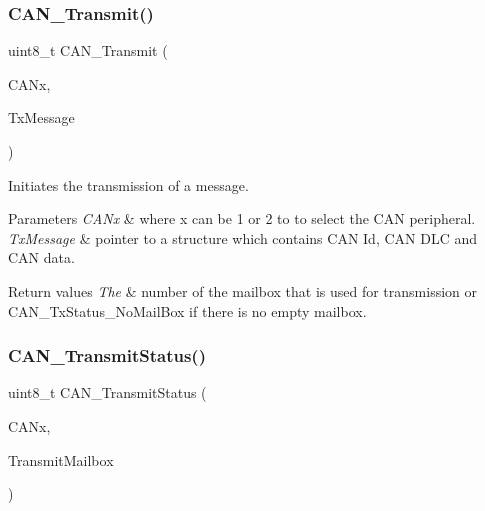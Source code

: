 \subsubsection{\texorpdfstring{CAN\_Transmit()}{CAN\_Transmit()}}
{\footnotesize\ttfamily uint8\+\_\+t C\+A\+N\+\_\+\+Transmit (\begin{DoxyParamCaption}\item[{\mbox{\hyperlink{struct_c_a_n___type_def}{C\+A\+N\+\_\+\+Type\+Def}} $\ast$}]{C\+A\+Nx,  }\item[{\mbox{\hyperlink{struct_can_tx_msg}{Can\+Tx\+Msg}} $\ast$}]{Tx\+Message }\end{DoxyParamCaption})}



Initiates the transmission of a message. 


\begin{DoxyParams}{Parameters}
{\em C\+A\+Nx} & where x can be 1 or 2 to to select the C\+AN peripheral. \\
\hline
{\em Tx\+Message} & pointer to a structure which contains C\+AN Id, C\+AN D\+LC and C\+AN data. \\
\hline
\end{DoxyParams}

\begin{DoxyRetVals}{Return values}
{\em The} & number of the mailbox that is used for transmission or C\+A\+N\+\_\+\+Tx\+Status\+\_\+\+No\+Mail\+Box if there is no empty mailbox. \\
\hline
\end{DoxyRetVals}
\mbox{\label{group___c_a_n___private___functions_ga68ab05a0a6cdfcc2b6f6b6b2c10848e2}} 
\subsubsection{\texorpdfstring{CAN\_TransmitStatus()}{CAN\_TransmitStatus()}}
{\footnotesize\ttfamily uint8\+\_\+t C\+A\+N\+\_\+\+Transmit\+Status (\begin{DoxyParamCaption}\item[{\mbox{\hyperlink{struct_c_a_n___type_def}{C\+A\+N\+\_\+\+Type\+Def}} $\ast$}]{C\+A\+Nx,  }\item[{uint8\+\_\+t}]{Transmit\+Mailbox }\end{DoxyParamCaption})}



